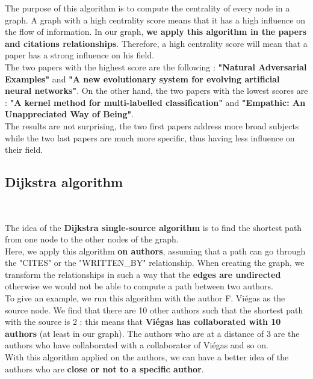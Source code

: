 \documentclass{article}
\begin{document}
The purpose of this algorithm is to compute the centrality of every node in a graph. A graph with a high centrality score means that it has a high influence on the flow of information. In our graph, \textbf{we apply this algorithm in the papers and citations relationships}. Therefore, a high centrality score will mean that a paper has a strong influence on his field. \\

The two papers with the highest score are the following : \textbf{"Natural Adversarial Examples"} and \textbf{"A new evolutionary system for evolving artificial neural networks"}. On the other hand, the two papers with the lowest scores are : \textbf{"A kernel method for multi-labelled classification"} and \textbf{"Empathic: An Unappreciated Way of Being"}. \\

The results are not surprising, the two first papers address more broad subjects while the two last papers are much more specific, thus having less influence on their field. 

\subsection{Dijkstra algorithm} \

The idea of the \textbf{Dijkstra single-source algorithm} is to find the shortest path from one node to the other nodes of the graph. \\

Here, we apply this algorithm \textbf{on authors}, assuming that a path can go through the "CITES" or the "WRITTEN\_BY" relationship. When creating the graph, we transform the relationships in such a way that the \textbf{edges are undirected} otherwise we would not be able to compute a path between two authors. \\

To give an example, we run this algorithm with the author F. Viégas as the source node. We find that there are 10 other authors such that the shortest path with the source is 2 : this means that \textbf{Viégas has collaborated with 10 authors} (at least in our graph). The authors who are at a distance of 3 are the authors who have collaborated with a collaborator of Viégas and so on. \\

With this algorithm applied on the authors, we can have a better idea of the authors who are \textbf{close or not to a specific author}.


\printbibliography
\end{document}
